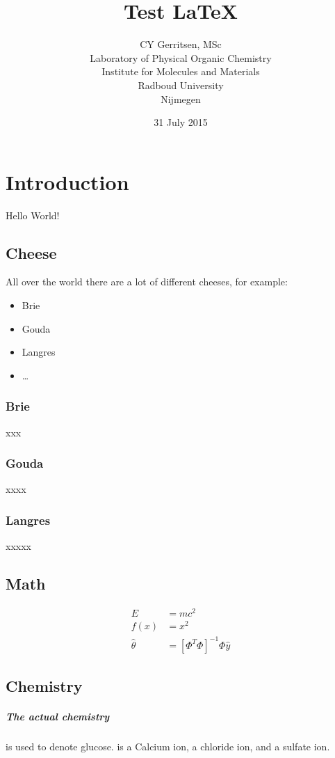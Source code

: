 \documentclass{report}
\title{Test \LaTeX{}}
\author{CY Gerritsen, MSc\\ Laboratory of Physical Organic Chemistry\\ Institute for Molecules and Materials\\ Radboud University\\ Nijmegen}
\date{31 July 2015}
\begin{document}
\maketitle
\setcounter{tocdepth}{1}
\tableofcontents{}

\chapter{Introduction}
Hello World!
\section{Cheese}
All over the world there are a lot of different cheeses, for example:
\begin{itemize}
\item Brie \item Gouda \item Langres \item \ldots

\end{itemize}
    \subsection{Brie} xxx
    \subsection{Gouda} xxxx
    \subsection{Langres} xxxxx
    
\section{Math}
\begin{align}
E &= mc^2\\
f(x) &= x^2\\
\hat{\theta} &= [\Phi^T \Phi]^{-1} \Phi \hat{y}
\end{align}

\section{Chemistry}
\paragraph{The actual chemistry}
     is used to denote glucose. 
     is a Calcium ion,  a chloride ion, and  a sulfate ion.\\
    \\
\end{document}
